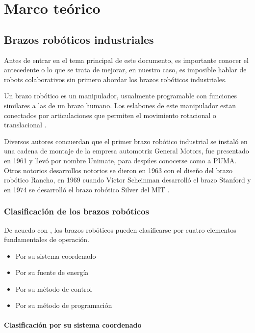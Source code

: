 \chapter{Marco teórico}\label{chap:Marcoteorico}


\section{Brazos robóticos industriales}

Antes de entrar en el tema principal de este documento, es importante conocer el antecedente o lo que se trata de mejorar, en nuestro caso, es imposible hablar de robots colaborativos sin primero abordar los brazos robóticos industriales.

Un brazo robótico es un manipulador, usualmente programable con funciones similares a las de un brazo humano. Los eslabones de este manipulador estan conectados por articulaciones que permiten el movimiento rotacional o translacional \cite{ReviewRoboticArm} \cite{Schilling2001}.

Diversos autores concuerdan que el primer brazo robótico industrial se instaló en una cadena de montaje de la empresa automotriz General Motors, fue presentado en 1961 y llevó por nombre Unimate, para despúes conocerse como a PUMA. Otros notorios desarrollos notorios se dieron en 1963 con el diseño del brazo robótico Rancho, en 1969 cuando Victor Scheinman desarrolló el brazo Stanford y en 1974 se desarrolló el brazo robótico Silver del MIT \cite{Moran2007}.


\subsection{Clasificación de los brazos robóticos}

De acuedo con \cite{Gupta2016}, los brazos robóticos pueden clasificarse por cuatro elementos fundamentales de operación.

\begin{itemize}
\itemsep0em
\item Por su sistema coordenado
\item Por su fuente de energía
\item Por su método de control
\item Por su método de programación
\end{itemize}

\subsubsection{Clasificación por su sistema coordenado}


